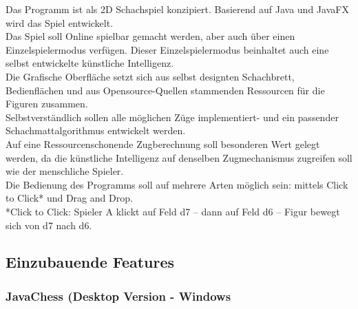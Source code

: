 \documentclass[12pt,a4paper]{article}
\begin{document}
{Das Programm ist als 2D Schachspiel konzipiert. Basierend auf Java und JavaFX wird das Spiel entwickelt. \\
Das Spiel soll Online spielbar gemacht werden, aber auch über einen Einzelspielermodus verfügen. Dieser Einzelspielermodus beinhaltet auch eine selbst entwickelte künstliche Intelligenz. \\
Die Grafische Oberfläche setzt sich aus selbst designten Schachbrett, Bedienflächen und aus Opensource-Quellen stammenden Ressourcen für die Figuren zusammen.\\
Selbstverständlich sollen alle möglichen Züge implementiert- und ein passender Schachmattalgorithmus entwickelt werden. \\
Auf eine Ressourcenschonende Zugberechnung soll besonderen Wert gelegt werden, da die künstliche Intelligenz auf denselben Zugmechanismus zugreifen soll wie der menschliche Spieler. \\
Die Bedienung des Programms soll auf mehrere Arten möglich sein:  mittels Click to Click* und Drag and Drop.\\
*Click to Click: Spieler A klickt auf Feld d7 – dann auf Feld d6 – Figur bewegt sich von d7 nach d6.

\subsection{Einzubauende Features}

\subsubsection{JavaChess (Desktop Version - Windows}

}
\end{document}
